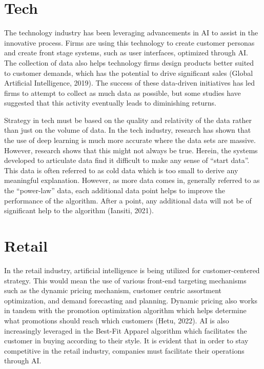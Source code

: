 \documentclass[
]{book}
\begin{document}
\hypertarget{tech}{%
\section{Tech}\label{tech}}

The technology industry has been leveraging advancements in AI to assist in the innovative process. Firms are using this technology to create customer personas and create front stage systems, such as user interfaces, optimized through AI. The collection of data also helps technology firms design products better suited to customer demands, which has the potential to drive significant sales (Global Artificial Intelligence, 2019). The success of these data-driven initiatives has led firms to attempt to collect as much data as possible, but some studies have suggested that this activity eventually leads to diminishing returns.

Strategy in tech must be based on the quality and relativity of the data rather than just on the volume of data. In the tech industry, research has shown that the use of deep learning is much more accurate where the data sets are massive. However, research shows that this might not always be true. Herein, the systems developed to articulate data find it difficult to make any sense of ``start data''. This data is often referred to as cold data which is too small to derive any meaningful explanation. However, as more data comes in, generally referred to as the ``power-law'' data, each additional data point helps to improve the performance of the algorithm. After a point, any additional data will not be of significant help to the algorithm (Iansiti, 2021).

\hypertarget{retail}{%
\section{Retail}\label{retail}}

In the retail industry, artificial intelligence is being utilized for customer-centered strategy. This would mean the use of various front-end targeting mechanisms such as the dynamic pricing mechanism, customer centric assortment optimization, and demand forecasting and planning. Dynamic pricing also works in tandem with the promotion optimization algorithm which helps determine what promotions should reach which customers (Hetu, 2022). AI is also increasingly leveraged in the Best-Fit Apparel algorithm which facilitates the customer in buying according to their style. It is evident that in order to stay competitive in the retail industry, companies must facilitate their operations through AI.
\end{document}

